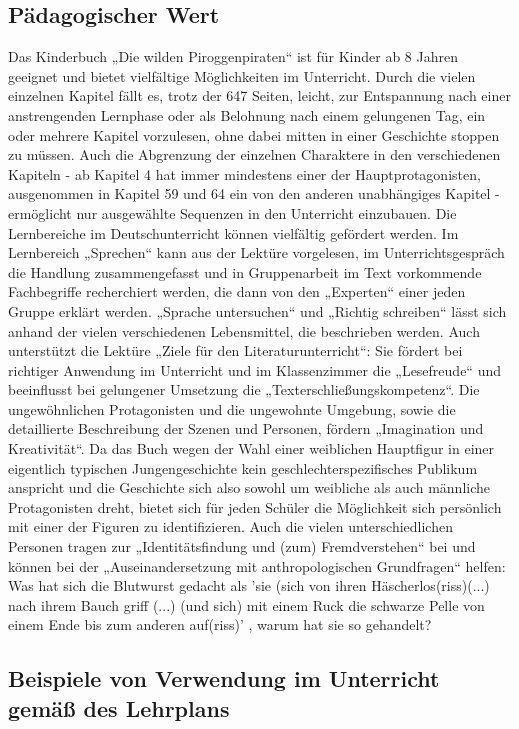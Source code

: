 \subsection{Pädagogischer Wert}
Das Kinderbuch „Die wilden Piroggenpiraten“ ist für Kinder ab 8 Jahren geeignet und bietet vielfältige Möglichkeiten im Unterricht. Durch die vielen einzelnen Kapitel fällt es, trotz der 647 Seiten, leicht, zur Entspannung nach einer anstrengenden Lernphase oder als Belohnung nach einem gelungenen Tag, ein oder mehrere Kapitel vorzulesen, ohne dabei mitten in einer Geschichte stoppen zu müssen. Auch die Abgrenzung der einzelnen Charaktere in den verschiedenen Kapiteln - ab Kapitel 4 hat immer mindestens einer der Hauptprotagonisten, ausgenommen in Kapitel 59 und 64 ein von den anderen unabhängiges Kapitel - ermöglicht nur ausgewählte Sequenzen in den Unterricht einzubauen. Die Lernbereiche im Deutschunterricht können vielfältig gefördert werden. Im Lernbereich „Sprechen“  kann aus der Lektüre vorgelesen, im Unterrichtsgespräch die Handlung zusammengefasst und in Gruppenarbeit im Text vorkommende Fachbegriffe recherchiert werden, die dann von den „Experten“ einer jeden Gruppe erklärt werden. „Sprache untersuchen“ und „Richtig schreiben“ lässt sich anhand der vielen verschiedenen Lebensmittel, die beschrieben werden. Auch unterstützt die Lektüre „Ziele für den Literaturunterricht“: Sie fördert bei richtiger Anwendung im Unterricht und im Klassenzimmer die „Lesefreude“ und beeinflusst bei gelungener Umsetzung die „Texterschließungskompetenz“. Die ungewöhnlichen Protagonisten und die ungewohnte Umgebung, sowie die detaillierte Beschreibung der Szenen und Personen, fördern „Imagination und Kreativität“. Da das Buch wegen der Wahl einer weiblichen Hauptfigur in einer eigentlich typischen Jungengeschichte kein geschlechterspezifisches Publikum anspricht und die Geschichte sich also sowohl um weibliche als auch männliche Protagonisten dreht, bietet sich für jeden Schüler die Möglichkeit sich persönlich mit einer der Figuren zu identifizieren. Auch die vielen unterschiedlichen Personen tragen zur „Identitätsfindung und (zum) Fremdverstehen“ bei und können bei der „Auseinandersetzung mit anthropologischen Grundfragen“ helfen: Was hat sich die Blutwurst gedacht  als 'sie (sich von ihren Häscherlos(riss)(...) nach ihrem Bauch griff (...) (und sich) mit einem Ruck die schwarze Pelle von einem Ende bis zum anderen auf(riss)' \cite[S.229]{pir},  warum hat sie so gehandelt?



\subsection{Beispiele von Verwendung im Unterricht gemäß des Lehrplans}

